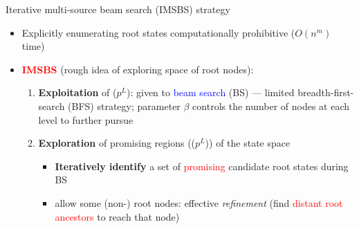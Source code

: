\documentclass{beamer}
\begin{document}
\begin{frame}{Iterative multi-source beam search (IMSBS) strategy}
      
      \begin{itemize}
      		\item Explicitly enumerating root states computationally prohibitive ($O(n^m)$ time) \vspace{0.7cm}
      		\item \textcolor{red}{\textbf{IMSBS}} (rough idea of exploring space of root nodes):  \vspace{0.2cm}
      		\begin{enumerate}
      		    \item  \textbf{Exploitation} of  ($p^L$): given to \textcolor{blue}{beam search} (BS) --- limited breadth-first-search (BFS) strategy;  {parameter $\beta$} controls the number of nodes at each level to further pursue \vspace{0.5cm}
      		    
      		    \item \textbf{Exploration} of promising regions (($p^L$)) of the state space  
      		    \begin{itemize}
      		       \item  \textbf{Iteratively identify} a set of \textcolor{red}{promising} candidate root states during BS
      		       \item allow some (non-) root nodes: effective \textit{refinement} (find \textcolor{red}{distant root ancestors} to reach that node)
      		    \end{itemize}
      		\end{enumerate}
      \end{itemize}  
\end{frame}
\end{document}
